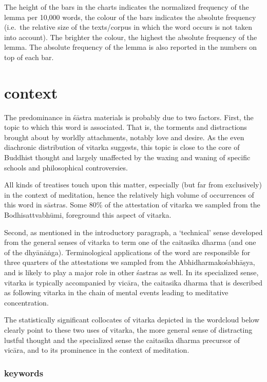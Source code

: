 \documentclass[
  letterpaper,
  DIV=11,
  numbers=noendperiod,
  oneside]{scrreprt}
\begin{document}
The height of the bars in the charts indicates the normalized frequency
of the lemma per 10,000 words, the colour of the bars indicates the
absolute frequency (i.e.~the relative size of the texts/corpus in which
the word occurs is not taken into account). The brighter the colour, the
highest the absolute frequency of the lemma. The absolute frequency of
the lemma is also reported in the numbers on top of each bar.

\hypertarget{sec-context}{%
\section{context}\label{sec-context}}

The predominance in śāstra materials is probably due to two factors.
First, the topic to which this word is associated. That is, the torments
and distractions brought about by worldly attachments, notably love and
desire. As the even diachronic distribution of vitarka suggests, this
topic is close to the core of Buddhist thought and largely unaffected by
the waxing and waning of specific schools and philosophical
controversies.

All kinds of treatises touch upon this matter, especially (but far from
exclusively) in the context of meditation, hence the relatively high
volume of occurrences of this word in sāstras. Some 80\% of the
attestation of vitarka we sampled from the Bodhisattvabhūmi, foreground
this aspect of vitarka.

Second, as mentioned in the introductory paragraph, a `technical' sense
developed from the general senses of vitarka to term one of the
caitasika dharma (and one of the dhyānāṅga). Terminological applications
of the word are responsible for three quarters of the attestations we
sampled from the Abhidharmakośabhāṣya, and is likely to play a major
role in other śastras as well. In its specialized sense, vitarka is
typically accompanied by vicāra, the caitasika dharma that is described
as following vitarka in the chain of mental events leading to meditative
concentration.

The statistically significant collocates of vitarka depicted in the
wordcloud below clearly point to these two uses of vitarka, the more
general sense of distracting lustful thought and the specialized sense
the caitasika dharma precursor of vicāra, and to its prominence in the
context of meditation.

\hypertarget{keywords-1}{%
\subsubsection{keywords}\label{keywords-1}}
\end{document}

